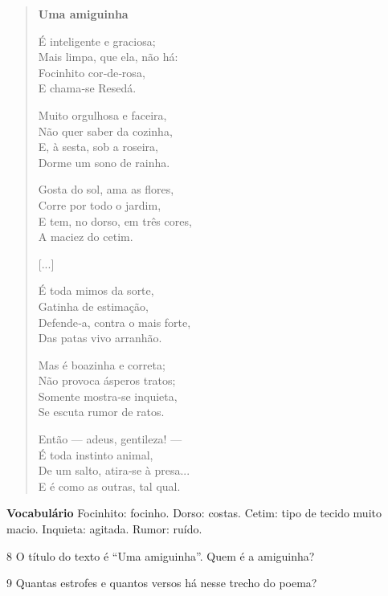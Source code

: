 \begin{verse}
\textbf{Uma amiguinha}

É inteligente e graciosa;\\
Mais limpa, que ela, não há:\\
Focinhito cor‑de‑rosa,\\
E chama‑se Resedá.

Muito orgulhosa e faceira,\\
Não quer saber da cozinha,\\
E, à sesta, sob a roseira,\\
Dorme um sono de rainha.

Gosta do sol, ama as flores,\\
Corre por todo o jardim,\\
E tem, no dorso, em três cores,\\
A maciez do cetim.

{[}...{]}

É toda mimos da sorte,\\
Gatinha de estimação,\\
Defende‑a, contra o mais forte,\\
Das patas vivo arranhão.

Mas é boazinha e correta;\\
Não provoca ásperos tratos;\\
Somente mostra‑se inquieta,\\
Se escuta rumor de ratos.
 
Então --- adeus, gentileza! ---\\
É toda instinto animal,\\
De um salto, atira‑se à presa...\\
E é como as outras, tal qual.
\end{verse}


\textbf{Vocabulário}
Focinhito: focinho.
Dorso: costas.
Cetim: tipo de tecido muito macio.
Inquieta: agitada.
Rumor: ruído.

\num{8} O título do texto é ``Uma amiguinha''. Quem é a amiguinha?


\num{9} Quantas estrofes e quantos versos há nesse trecho do poema?


